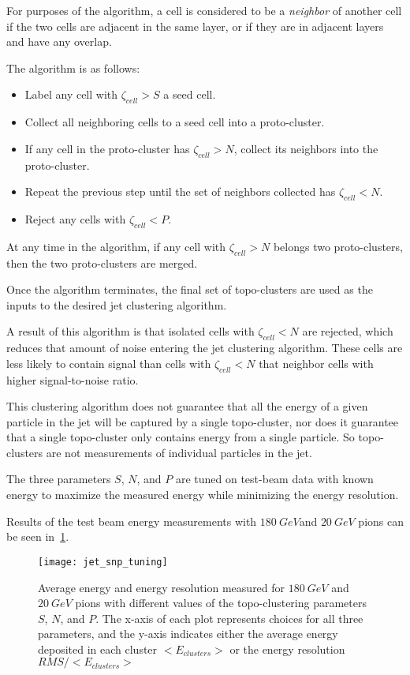 For purposes of the algorithm, a cell is considered to be a \textit{neighbor} of another cell if the two cells are
adjacent in the same layer, or if they are in adjacent layers and have any overlap.\cite{jet-topo-cluster}

The algorithm is as follows:
\begin{itemize}
    \item Label any cell with $\zeta_{cell}>S$ a seed cell.
    \item Collect all neighboring cells to a seed cell into a proto-cluster.
    \item If any cell in the proto-cluster has $\zeta_{cell}>N$, collect its neighbors into the proto-cluster.
    \item Repeat the previous step until the set of neighbors collected has $\zeta_{cell}<N$.
    \item Reject any cells with $\zeta_{cell}<P$.
\end{itemize}

At any time in the algorithm, if any cell with $\zeta_{cell}>N$ belongs two proto-clusters, then the two
proto-clusters are merged.\cite{jet-topo-cluster}

Once the algorithm terminates, the final set of topo-clusters are used as the inputs to the desired jet clustering
algorithm.

A result of this algorithm is that isolated cells with $\zeta_{cell} < N$ are rejected, which reduces that amount
of noise entering the jet clustering algorithm.
These cells are less likely to contain signal than cells with $\zeta_{cell}<N$ that neighbor cells with higher
signal-to-noise ratio.

This clustering algorithm does not guarantee that all the energy of a given particle in the jet will be captured by a single
topo-cluster, nor does it guarantee that a single topo-cluster only contains energy from a single particle.
So topo-clusters are not measurements of individual particles in the jet.

The three parameters $S$, $N$, and $P$ are tuned on test-beam data with known energy to maximize the measured energy
while minimizing the energy resolution\cite{jet-energy-measurement}.

Results of the test beam energy measurements with $180~GeV$and $20~GeV$ pions can be seen in~\ref{fig:jet_snp_tuning}.

\begin{figure}[h!]
    \centering
\texttt{[image: jet\_snp\_tuning]}
\caption{Average energy and energy resolution measured for $180~GeV$ and $20~GeV$ pions with different values of the
topo-clustering parameters $S$, $N$, and $P$.
The x-axis of each plot represents choices for all three parameters, and the y-axis indicates either the average
energy deposited in each cluster $<E_{clusters}>$ or the energy resolution $RMS/<E_{clusters}>$}
\label{fig:jet_snp_tuning}
\end{figure}\cite{jet-energy-measurement}

